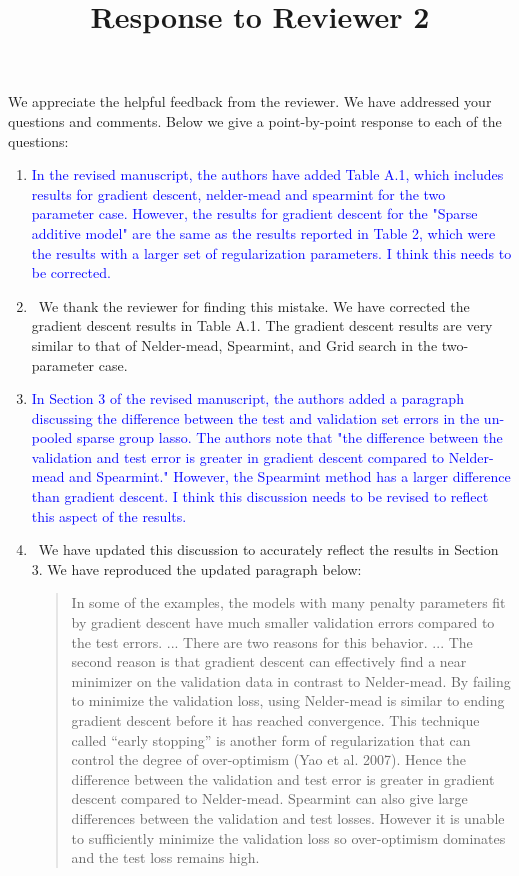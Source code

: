 \documentclass[]{article}
\title{Response to Reviewer 2}
\newcommand{\point}[1]{\item \textcolor{blue}{#1}}
\newcommand{\reply}{\item[]\ }
\begin{document}
	\maketitle
		
	We appreciate the helpful feedback from the reviewer. We have addressed your questions and comments. Below we give a point-by-point response to each of the questions:
		
	\begin{enumerate}
		\point{In the revised manuscript, the authors have added Table A.1, which includes results for gradient descent, nelder-mead and spearmint for the two parameter case.  However, the results for gradient descent for the "Sparse additive model" are the same as the results reported in Table 2, which were the results with a larger set of regularization parameters.  I think this needs to be corrected.}
		
		\reply We thank the reviewer for finding this mistake. We have corrected the gradient descent results in Table A.1. The gradient descent results are very similar to that of Nelder-mead, Spearmint, and Grid search in the two-parameter case.
		
		\point{In Section 3 of the revised manuscript, the authors added a paragraph discussing the difference between the test and validation set errors in the un-pooled sparse group lasso.  The authors note that "the difference between the validation and test error is greater in gradient descent compared to Nelder-mead and Spearmint."  However, the Spearmint method has a larger difference than gradient descent.  I think this discussion needs to be revised to reflect this aspect of the results.}
		
		\reply We have updated this discussion to accurately reflect the results in Section 3. We have reproduced the updated paragraph below:
		
		\begin{quote}
				In some of the examples, the models with many penalty parameters fit by gradient descent have much smaller validation errors compared to the test errors. ... There are two reasons for this behavior. ... The second reason is that gradient descent can effectively find a near minimizer on the validation data in contrast to Nelder-mead. By failing to minimize the validation loss, using Nelder-mead is similar to ending gradient descent before it has reached convergence. This technique called ``early stopping'' is another form of regularization that can control the degree of over-optimism (Yao et al. 2007). Hence the difference between the validation and test error is greater in gradient descent compared to Nelder-mead. Spearmint can also give large differences between the validation and test losses. However it is unable to sufficiently minimize the validation loss so over-optimism dominates and the test loss remains high.
		\end{quote}
		
	\end{enumerate}
\end{document}
